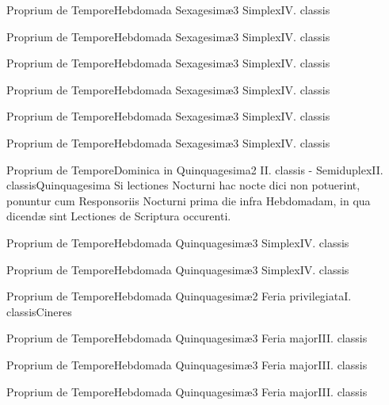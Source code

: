 \documentclass[liber-responsorialis-hiemalis.tex]{subfiles}
\begin{document}
	{Proprium de Tempore}{Hebdomada Sexagesimæ}{3}{}
	{Simplex}{IV. classis}{}
	{}
	{}

	{Proprium de Tempore}{Hebdomada Sexagesimæ}{3}{}
	{Simplex}{IV. classis}{}
	{}
	{}

	{Proprium de Tempore}{Hebdomada Sexagesimæ}{3}{}
	{Simplex}{IV. classis}{}
	{}
	{}

	{Proprium de Tempore}{Hebdomada Sexagesimæ}{3}{}
	{Simplex}{IV. classis}{}
	{}
	{}

	{Proprium de Tempore}{Hebdomada Sexagesimæ}{3}{}
	{Simplex}{IV. classis}{}
	{}
	{}

	{Proprium de Tempore}{Hebdomada Sexagesimæ}{3}{}
	{Simplex}{IV. classis}{}
	{}
	{}

	{Proprium de Tempore}{Dominica in Quinquagesima}{2}{}
	{II. classis - Semiduplex}{II. classis}{Quinquagesima}
	{Si lectiones  Nocturni hac nocte dici non potuerint, ponuntur cum Responsoriis  Nocturni prima die infra Hebdomadam, in qua dicendæ sint Lectiones de Scriptura occurenti.}
	{}

	{Proprium de Tempore}{Hebdomada Quinquagesimæ}{3}{}
	{Simplex}{IV. classis}{}
	{}
	{}

	{Proprium de Tempore}{Hebdomada Quinquagesimæ}{3}{}
	{Simplex}{IV. classis}{}
	{}
	{}

	{Proprium de Tempore}{Hebdomada Quinquagesimæ}{2}{}
	{Feria privilegiata}{I. classis}{Cineres}
	{}
	{}

	{Proprium de Tempore}{Hebdomada Quinquagesimæ}{3}{}
	{Feria major}{III. classis}{}
	{}
	{}

	{Proprium de Tempore}{Hebdomada Quinquagesimæ}{3}{}
	{Feria major}{III. classis}{}
	{}
	{}

	{Proprium de Tempore}{Hebdomada Quinquagesimæ}{3}{}
	{Feria major}{III. classis}{}
	{}
	{}
\end{document}
